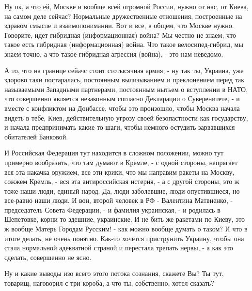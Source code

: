 Ну ок, а что ей, Москве и вообще всей огромной России, нужно от нас, от Киева,
на самом деле сейчас?  Нормальные дружественные отношения, построенные на
здравом смысле и взаимопонимании. Вот и все, в общем, что Москве нужно.
Говорите, идет гибридная (информационная) война? Мы честно не знаем, что такое
есть гибридная (информационная) война. Что такое велосипед-гибрид, мы знаем
точно, а что такое гибридная агрессия (война), - это нам неведомо. 

А то, что на границе сейачс стоит стотысячная армия, - ну так ты, Украина, уже
здорово таки постаралась, постоянным вылизыванием и преклонением перед так
называемыми Западными партнерами, постоянным нытьем о вступлении в НАТО, что
совершенно является незаконным согласно Декларации о Суверенитете, - и вместе с
конфликтом на Донбассе, чтобы это произошло, чтобы Москва начала видеть в тебе,
Киев, действительную угрозу своей безопастности как государству, и начала
предпринимать какие-то шаги, чтобы немного остудить зарвавшихся обитателей
Банковой.

И Российская Федерация тут находится в сложном положении, можно тут примерно
вообразить, что там думают в Кремле, - с одной стороны, напрягает вся эта
накачка оружием, все эти крики, что мы направим ракеты на Москву, сожжем
Кремль, - вся эта антироссийская истерия, - а с другой стороны, это ж тоже наши
люди, единый народ. Да, люди заболевшие, люди опустившиеся, но все-равно наши
люди.  И вон, второй человек в РФ - Валентина Матвиенко, - председатель Совета
Федерации, - и фамилия украинская, - и родилась в Шепетовке, корни то здешние,
украинские. И не бить же ракетами по Киеву, это ж вообще Матерь Городам
Русским! - как можно вообще думать о таком? И что в итоге делать, не очень
понятно. Как-то хочется приструнить Украину, чтобы она стала нормальной
адекватной страной и перестала трепать нервы, - а как это сделать, совершенно
не ясно.

Ну и какие выводы изо всего этого потока сознания, скажете Вы? Ты тут, товарищ,
наговорил с три короба, а что ты, собственно, хотел сказать?

